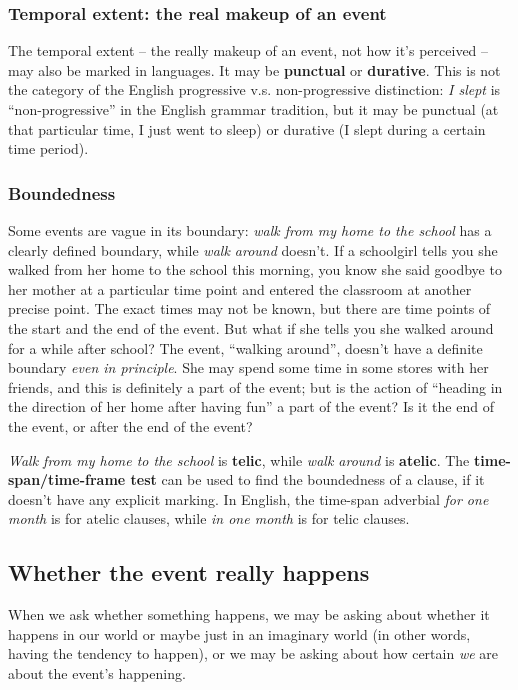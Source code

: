 \documentclass[UTF8, a4paper, oneside, scheme=plain]{ctexart}
\newcommand*{\concept}[1]{\textbf{#1}}
\newcommand*{\corpus}[1]{\emph{#1}}
\begin{document}
\subsubsection{Temporal extent: the real makeup of an event}

The temporal extent -- the really makeup of an event, not how it's perceived -- 
may also be marked in languages.
It may be \concept{punctual} or \concept{durative}.
This is not the category of the English progressive v.s. non-progressive distinction:
\corpus{I slept} is ``non-progressive'' in the English grammar tradition,
but it may be punctual (at that particular time, I just went to sleep) 
or durative (I slept during a certain time period).

\subsubsection{Boundedness}

Some events are vague in its boundary:
\corpus{walk from my home to the school} has a clearly defined boundary,
while \corpus{walk around} doesn't.
If a schoolgirl tells you she walked from her home to the school this morning,
you know she said goodbye to her mother at a particular time point 
and entered the classroom at another precise point.
The exact times may not be known,
but there are time points of the start and the end of the event.
But what if she tells you she walked around for a while after school?
The event, ``walking around'', doesn't have a definite boundary
\emph{even in principle}.
She may spend some time in some stores with her friends,
and this is definitely a part of the event;
but is the action of ``heading in the direction of her home after having fun''
a part of the event?
Is it the end of the event, or after the end of the event?

\corpus{Walk from my home to the school} is \concept{telic},
while \corpus{walk around} is \concept{atelic}.
The \concept{time-span/time-frame test} can be used to find the boundedness of a clause,
if it doesn't have any explicit marking.
In English, the time-span adverbial \corpus{for one month} is for atelic clauses,
while \corpus{in one month} is for telic clauses.

\subsection{Whether the event really happens}

When we ask whether something happens,
we may be asking about whether it happens in our world 
or maybe just in an imaginary world (in other words, having the tendency to happen),
or we may be asking about how certain \emph{we} are about the event's happening.
\end{document}
